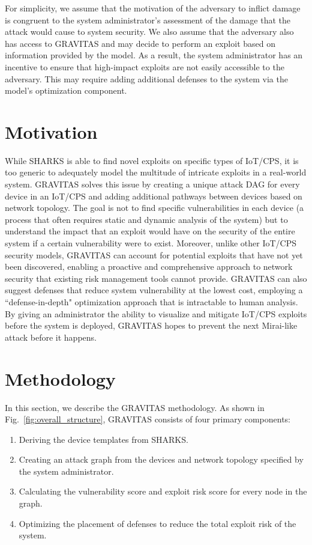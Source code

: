 \documentclass[10pt,journal,compsoc]{IEEEtran}
\begin{document}
\par For simplicity, we assume that the motivation of the adversary to inflict damage is congruent to the system administrator’s assessment of the damage that the attack would cause to system security. We also assume that the adversary also has access to GRAVITAS and may decide to perform an exploit based on information provided by the model. As a result, the system administrator has an incentive to ensure that high-impact exploits are not easily accessible to the adversary. This may require adding additional defenses to the system via the model's optimization component.

\section{Motivation}
\label{section:Motivation}
While SHARKS is able to find novel exploits on specific types of IoT/CPS, it is too generic to adequately model the multitude of intricate exploits in a real-world system. GRAVITAS solves this issue by creating a unique attack DAG for every device in an IoT/CPS and adding additional pathways between devices based on network topology. The goal is not to find specific vulnerabilities in each device (a process that often requires static and dynamic analysis of the system) but to understand the impact that an exploit would have on the security of the entire system if a certain vulnerability were to exist. Moreover, unlike other IoT/CPS security models, GRAVITAS can account for potential exploits that have not yet been discovered, enabling a proactive and comprehensive approach to network security that existing risk management tools cannot provide. GRAVITAS can also suggest defenses that reduce system vulnerability at the lowest cost, employing a ``defense-in-depth" optimization approach that is intractable to human analysis. By giving an administrator the ability to visualize and mitigate IoT/CPS exploits before the system is deployed, GRAVITAS hopes to prevent the next Mirai-like attack before it happens.

\section{Methodology}
\label{section::Methodology}

In this section, we describe the GRAVITAS methodology.
As shown in Fig.~\ref{fig:overall_structure}, GRAVITAS consists of four primary components:
\begin{enumerate}
    \item Deriving the device templates from SHARKS.
    \item Creating an attack graph from the devices and network topology specified by the system administrator.
    \item Calculating the vulnerability score and exploit risk score for every node in the graph.
    \item Optimizing the placement of defenses to reduce the total exploit risk of the system.
\end{enumerate}
\end{document}
